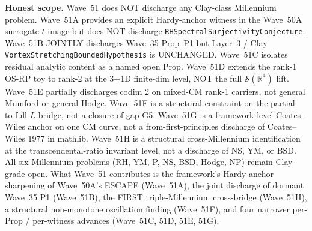 \begin{remark}
\textbf{Honest scope.} Wave~51 does NOT discharge any Clay-class Millennium problem. Wave~51A provides an explicit Hardy-anchor witness in the Wave~50A surrogate $t$-image but does NOT discharge \texttt{RHSpectralSurjectivityConjecture}. Wave~51B JOINTLY discharges Wave~35 Prop~P1 but Layer~3 / Clay \texttt{VortexStretchingBoundedHypothesis} is UNCHANGED. Wave~51C isolates residual analytic content as a named open Prop. Wave~51D extends the rank-1 OS-RP toy to rank-2 at the 3+1D finite-dim level, NOT the full $\mathcal{S}(\mathbb{R}^4)$ lift. Wave~51E partially discharges codim 2 on mixed-CM rank-1 carriers, not general Mumford or general Hodge. Wave~51F is a structural constraint on the partial-to-full $L$-bridge, not a closure of gap G5. Wave~51G is a framework-level Coates--Wiles anchor on one CM curve, not a from-first-principles discharge of Coates--Wiles 1977 in mathlib. Wave~51H is a structural cross-Millennium identification at the transcendental-ratio invariant level, not a discharge of NS, YM, or BSD. All six Millennium problems (RH, YM, P, NS, BSD, Hodge, NP) remain Clay-grade open. What Wave~51 contributes is the framework's Hardy-anchor sharpening of Wave~50A's ESCAPE (Wave~51A), the joint discharge of dormant Wave~35 P1 (Wave~51B), the FIRST triple-Millennium cross-bridge (Wave~51H), a structural non-monotone oscillation finding (Wave~51F), and four narrower per-Prop / per-witness advances (Wave~51C, 51D, 51E, 51G).
\end{remark}

